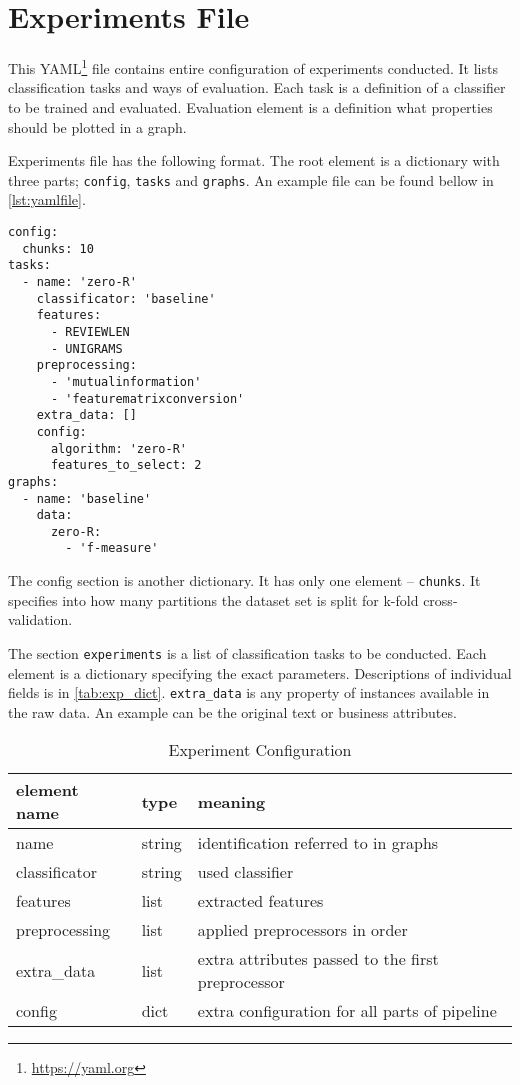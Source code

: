 \section{Experiments File}

This YAML\footnote{\url{https://yaml.org}}  file contains entire configuration of experiments conducted.
It lists classification tasks and ways of evaluation.
Each task is a definition of a classifier to be trained and evaluated.
Evaluation element is a definition what properties should be plotted in a graph.

Experiments file has the following format.
The root element is a dictionary with three parts;
\texttt{config}, \texttt{tasks} and \texttt{graphs}.
An example file can be found bellow in \autoref{lst:yamlfile}.

\begin{lstlisting}[label={lst:yamlfile}]
config:
  chunks: 10
tasks:
  - name: 'zero-R'
    classificator: 'baseline'
    features:
      - REVIEWLEN
      - UNIGRAMS
    preprocessing:
      - 'mutualinformation'
      - 'featurematrixconversion'
    extra_data: []
    config:
      algorithm: 'zero-R'
      features_to_select: 2
graphs:
  - name: 'baseline'
    data:
      zero-R:
        - 'f-measure'
\end{lstlisting}

The config section is another dictionary.
It has only one element -- \texttt{chunks}.
It specifies into how many partitions the dataset set is split for k-fold cross-validation.

The section \texttt{experiments} is a list of classification tasks to be conducted.
Each element is a dictionary specifying the exact parameters.
Descriptions of individual fields is in \autoref{tab:exp_dict}.
\texttt{extra\_data} is any property of instances available in the raw data.
An example can be the original text or business attributes.

\begin{table}[h]

\centering
\begin{tabular}{lll}
\toprule
\textbf{element name} & \textbf{type} & \textbf{meaning}\\
\midrule
name 			& string	& identification referred to in graphs\\
classificator 	& string	& used classifier\\
features 		& list		& extracted features \todoA{reference} \\
preprocessing 	& list		& applied preprocessors in order\\
extra\_data 	& list 		& extra attributes passed to the first preprocessor \\
config			& dict		& extra configuration for all parts of pipeline \\
\bottomrule
\end{tabular}

\caption{Experiment Configuration}\label{tab:exp_dict}
\end{table}


